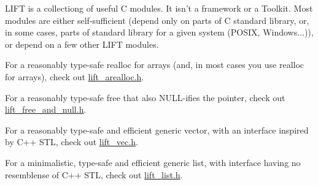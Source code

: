 L\-I\-F\-T is a collectiong of useful C modules. It isn't a framework or a Toolkit. Most modules are either self-\/sufficient (depend only on parts of C standard library, or, in some cases, parts of standard library for a given system (P\-O\-S\-I\-X, Windows...)), or depend on a few other L\-I\-F\-T modules.

For a reasonably type-\/safe realloc for arrays (and, in most cases you use realloc for arrays), check out \hyperlink{lift__arealloc_8h}{lift\-\_\-arealloc.\-h}.

For a reasonably type-\/safe free that also N\-U\-L\-L-\/ifies the pointer, check out \hyperlink{lift__free__and__null_8h}{lift\-\_\-free\-\_\-and\-\_\-null.\-h}.

For a reasonably type-\/safe and efficient generic vector, with an interface inspired by C++ S\-T\-L, check out \hyperlink{lift__vec_8h}{lift\-\_\-vec.\-h}.

For a minimalistic, type-\/safe and efficient generic list, with interface having no resemblense of C++ S\-T\-L, check out \hyperlink{lift__list_8h}{lift\-\_\-list.\-h}. 